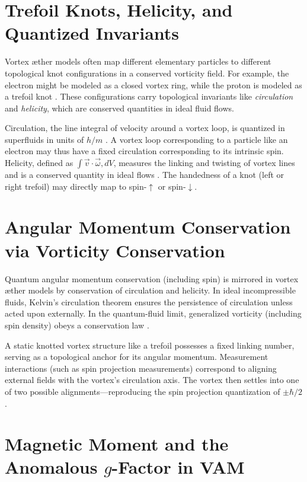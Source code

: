 \section*{Trefoil Knots, Helicity, and Quantized Invariants}

Vortex \ae{}ther models often map different elementary particles to different topological knot configurations in a conserved vorticity field. For example, the electron might be modeled as a closed vortex ring, while the proton is modeled as a trefoil knot \cite{PhysicsDetectivePair}. These configurations carry topological invariants like \textit{circulation} and \textit{helicity}, which are conserved quantities in ideal fluid flows.


Circulation, the line integral of velocity around a vortex loop, is quantized in superfluids in units of $h/m$ \cite{PRR2021}. A vortex loop corresponding to a particle like an electron may thus have a fixed circulation corresponding to its intrinsic spin. Helicity, defined as $\int \vec{v} \cdot \vec{\omega}, dV$, measures the linking and twisting of vortex lines and is a conserved quantity in ideal flows \cite{PNAS2014}. The handedness of a knot (left or right trefoil) may directly map to spin-$\uparrow$ or spin-$\downarrow$.


\section*{Angular Momentum Conservation via Vorticity Conservation}

Quantum angular momentum conservation (including spin) is mirrored in vortex \ae{}ther models by conservation of circulation and helicity. In ideal incompressible fluids, Kelvin's circulation theorem ensures the persistence of circulation unless acted upon externally. In the quantum-fluid limit, generalized vorticity (including spin density) obeys a conservation law \cite{PRL2011}.


A static knotted vortex structure like a trefoil possesses a fixed linking number, serving as a topological anchor for its angular momentum. Measurement interactions (such as spin projection measurements) correspond to aligning external fields with the vortex's circulation axis. The vortex then settles into one of two possible alignments—reproducing the spin projection quantization of $\pm \hbar/2$.


\section*{Magnetic Moment and the Anomalous \texorpdfstring{$g$}{g}-Factor in VAM}

